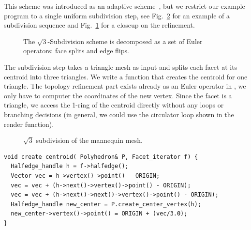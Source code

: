 \label{sec:sqrt3}

This scheme was introduced as an adaptive scheme~\cite{sqrt3}, but we
restrict our example program to a single uniform subdivision step, see
Fig.~\ref{fig:sqrt3} for an example of a subdivision sequence and
Fig.~\ref{fig:sqrt3_basic} for a closeup on the refinement.


\begin{figure}[htb]
    \caption{The $\sqrt{3}$-Subdivision scheme is decomposed as
             a set of Euler operators: face splits and edge flips.}
    \label{fig:sqrt3_basic}
\end{figure}

The subdivision step takes a triangle mesh as input and splits each
facet at its centroid into three triangles.  We write a function that
creates the centroid for one triangle. The topology refinement part
exists already as an Euler operator in \cgalpoly, we only have to
computer the coordinates of the new vertex. Since the facet is a
triangle, we access the 1-ring of the centroid directly without any
loops or branching decisions (in general, we could use the circulator
loop shown in the render function).%


\begin{figure}[htb]
    \caption{$\sqrt{3}$ subdivision of the mannequin mesh.}
    \label{fig:sqrt3}
\end{figure}


\begin{lstlisting}
void create_centroid( Polyhedron& P, Facet_iterator f) {
  Halfedge_handle h = f->halfedge();
  Vector vec = h->vertex()->point() - ORIGIN;
  vec = vec + (h->next()->vertex()->point() - ORIGIN);
  vec = vec + (h->next()->next()->vertex()->point() - ORIGIN);
  Halfedge_handle new_center = P.create_center_vertex(h);
  new_center->vertex()->point() = ORIGIN + (vec/3.0);
}
\end{lstlisting}%

